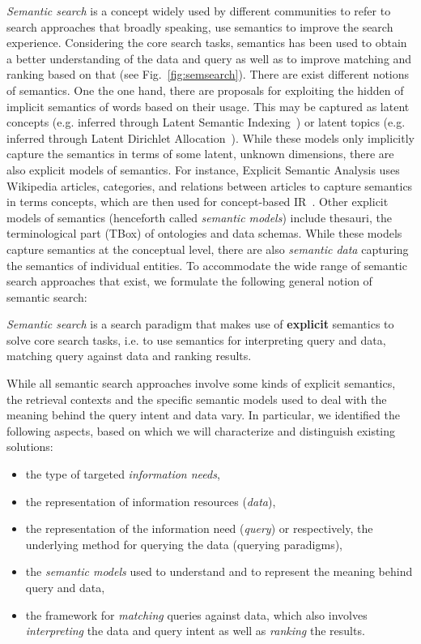 \emph{Semantic search} is a concept widely used by different communities to refer to search approaches that broadly speaking, use semantics to improve the search experience. Considering the core search tasks, semantics has been used to obtain a better understanding of the data and query as well as to improve matching and ranking based on that (see Fig.~\ref{fig:semsearch}). There are exist different notions of semantics. One the one hand, there are proposals for exploiting the hidden of implicit semantics of words based on their usage. This may be captured as latent concepts (e.g. inferred through Latent Semantic Indexing~\cite{DBLP:conf/sigir/Hofmann99}) or latent topics (e.g. inferred through Latent Dirichlet Allocation~\cite{DBLP:conf/sigir/WeiC06}). While these models only implicitly capture the semantics in terms of some latent, unknown dimensions, there are also explicit models of semantics. For instance, Explicit Semantic Analysis uses Wikipedia articles, categories, and relations between articles to capture semantics in terms concepts, which are then used for concept-based IR~\cite{DBLP:journals/tois/EgoziMG11}. Other explicit models of semantics (henceforth called \emph{semantic models}) include thesauri, the terminological part (TBox) of ontologies and data schemas. While these models capture semantics at the conceptual level, there are also \emph{semantic data} capturing the semantics of individual entities. To accommodate the wide range of semantic search approaches that exist, we formulate the following general notion of semantic search:

\begin{definition} \emph{Semantic search} is a search paradigm that makes use of \textbf{explicit} semantics to solve core search tasks, i.e. to use semantics for interpreting query and data, matching query against data and ranking results. 
\end{definition}

While all semantic search approaches involve some kinds of explicit semantics, the retrieval contexts and the specific semantic models used to deal with the meaning behind the query intent and data vary. In particular, we identified the following aspects, based on which we will characterize and distinguish existing solutions:

\begin{itemize}
\item the type of targeted \emph{information needs},  
\item the representation of information resources (\emph{data}), 
\item the representation of the information need (\textit{query}) or respectively, the underlying method for querying the data (querying paradigms), 
\item the \emph{semantic models} used to understand and to represent the meaning behind query and data, 
\item the framework for \emph{matching} queries against data, which also involves \emph{interpreting} the data and query intent as well as \emph{ranking} the results.  
\end{itemize}

